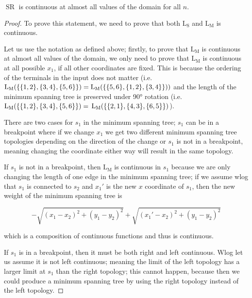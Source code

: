 \documentclass{mpaper}
\begin{document}
\begin{lemma}
  $\operatorname{SR}$ is continuous at almost all values of the domain for all $n$.
\end{lemma}
\begin{proof}
  To prove this statement, we need to prove that both $\operatorname{L_S}$ and $\operatorname{L_M}$ is continuous.

  Let us use the notation as defined above; firstly, to prove that $\operatorname{L_M}$ is continuous at almost all values of the domain, we only need to prove  that $\operatorname{L_M}$ is continuous at all possible $x_1$, if all other coordinates are fixed. This is because the ordering of the terminals in the input does not matter (i.e. $\operatorname{L_M}(\{\{1,2\}, \{3,4\}, \{5,6\}\})=\operatorname{L_M}(\{\{5,6\}, \{1,2\}, \{3,4\}\}))\\$ and the length of the minimum spanning tree is preserved under 90° rotation (i.e. $\operatorname{L_M}(\{\{1,2\}, \{3,4\}, \{5,6\}\})=\\\operatorname{L_M}(\{\{2,1\}, \{4,3\}, \{6,5\}\})$).

  There are two cases for $s_1$ in the minimum spanning tree; $s_1$ can be in a breakpoint where if we change $x_1$ we get two different minimum spanning tree topologies depending on the direction of the change or $s_1$ is not in a breakpoint, meaning changing the coordinate either way will result in the same topology.

  If $s_1$ is not in a breakpoint, then $\operatorname{L_M}$ is continuous in $s_1$ because we are only changing the length of one edge in the minimum spanning tree; if we assume wlog that $s_1$ is connected to $s_2$ and $x_1'$ is the new $x$ coordinate of $s_1$, then the new weight of the minimum spanning tree is
  
  $$-\sqrt{(x_1-x_2)^2 + (y_1-y_2)^2} + \sqrt{(x_1'-x_2)^2 + (y_1-y_2)^2}$$

  which is a composition of continuous functions and thus is continuous.

  If $s_1$ is in a breakpoint, then it must be both right and left continuous. Wlog let us assume it is not left continuous; meaning the limit of the left topology has a larger limit at $s_1$ than the right topology; this cannot happen, because then we could produce a minimum spanning tree by using the right topology instead of the left topology.



\end{proof}
\end{document}
